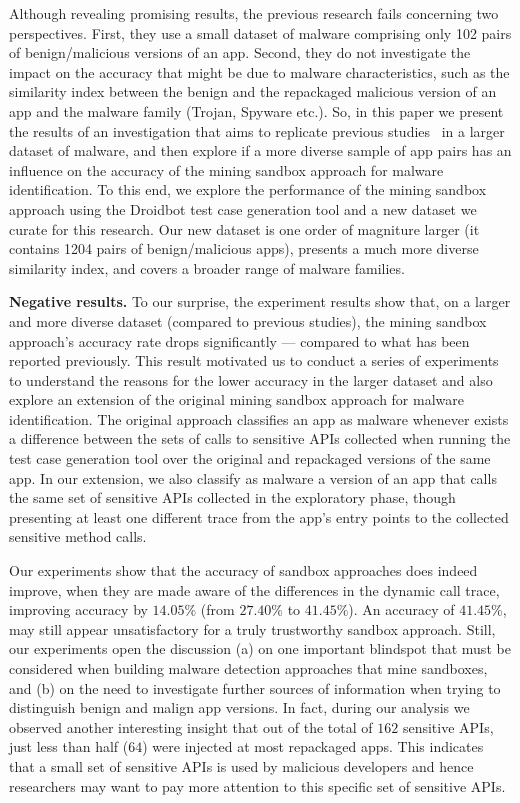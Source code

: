 Although revealing promising results, the previous research fails concerning two perspectives. First, they use a small dataset of malware comprising only 102 pairs of benign/malicious versions of an app. Second, they do not investigate the impact on the accuracy that might be due to malware characteristics, such as the similarity index between the benign and the repackaged malicious version of an app and the malware family {\color{red}(Trojan, Spyware etc.)}. So, in this paper we present the results of an investigation that aims to replicate previous studies~\cite{} in a larger dataset of malware, and then explore if a more diverse sample of app pairs has an influence on the accuracy of the mining sandbox approach for malware identification. To this end, we explore the performance of the mining sandbox approach using the Droidbot test case generation tool and a new dataset we curate for this research. Our new dataset is one order of magniture larger (it contains 1204 pairs of benign/malicious apps), presents a much more diverse similarity index, and covers a broader range of malware families. 



{\bf Negative results.} To our surprise, the experiment results show that, on a larger and more diverse dataset (compared to previous studies), the mining sandbox approach's accuracy rate drops significantly --- compared to what has been reported previously. This result motivated us to conduct a series of experiments to understand the reasons for the lower accuracy in the larger dataset and also explore an extension of the original mining sandbox approach for malware identification. The original approach classifies an app as malware whenever exists a difference between the sets of calls to sensitive APIs collected when running the test case generation tool over the original and repackaged versions of the same app. In our extension, we also classify as malware a version of an app that calls the same set of sensitive APIs collected in the exploratory phase, though presenting at least one different trace from the app's entry points to the collected sensitive method calls.


Our experiments show that the accuracy of sandbox approaches does indeed improve, when they are made aware of the differences in the dynamic call trace, improving accuracy by $14.05\%$ (from $27.40\%$ to $41.45\%$). 
An accuracy of $41.45\%$, may still appear unsatisfactory for a truly trustworthy sandbox approach. Still, 
our experiments open the discussion (a) on one important blindspot that must be considered when building 
malware detection approaches that mine sandboxes, and (b) on the need to investigate further sources of information when trying to distinguish benign and malign app versions. 
In fact, during our analysis we observed another interesting insight that out of the total of $162$ sensitive APIs, just less than half ($64$) were injected at most repackaged apps. 
This indicates that a small set of sensitive APIs is used by malicious developers and hence 
researchers may want to pay more attention to this specific set of sensitive APIs.\\


